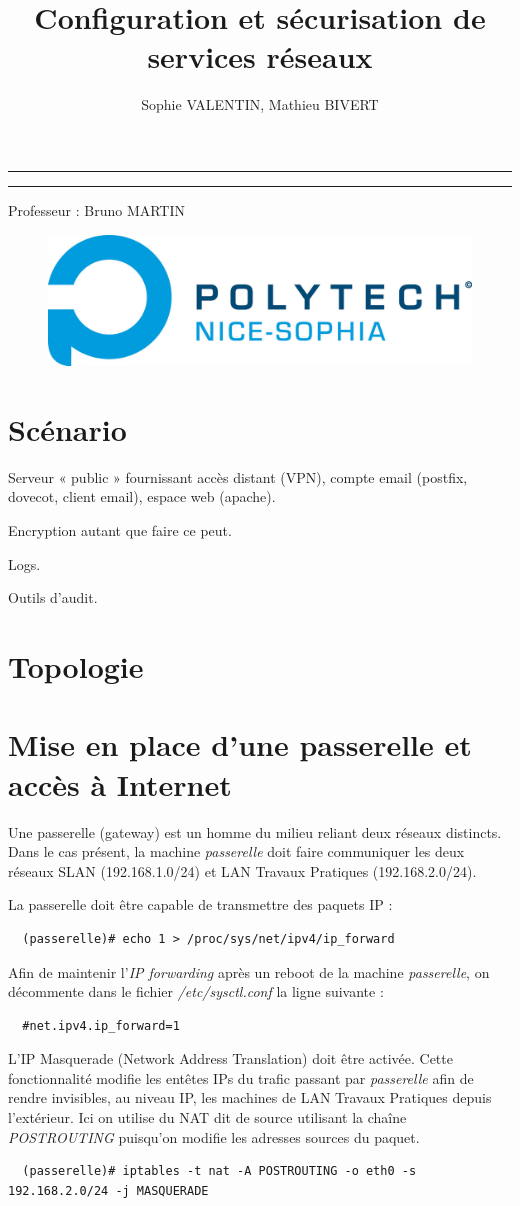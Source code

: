 \documentclass[a4paper]{article}
\title{Configuration et sécurisation de services réseaux}
\author{Sophie VALENTIN, Mathieu BIVERT}
\makeatletter
\def\maketitle{
	\null
	\thispagestyle{empty}
	\vskip 1cm
	\begin{center}
		\normalfont\large\huge\@author
	\end{center}
	\vfil
	\vfil
	\vfil
	\vfil
	\vfil
	\vfil
	\vfil
	\vfil
	\vfil
	\vfil
	\vfil
	\hrule height 2pt
	\par
	\begin{center}
				\huge \strut \@title \par
				\@date
	\end{center}
	\hrule height 2pt
	\par
	\vfil
	\vfil
	\vfil
	\vfil
	\vfil
	\vfil
	\vfil
	\vfil
	\vfil
	\vfil
	\vfil
	\vfil
	\vfil
	\vfil
	\vfil
	\vfil
	\vfil
	\vfil
	\vfil
	\vfil
	\vfil
	\vfil
	\vfil
	\vfil
	\vfil
	\begin{center}
  			\huge Professeur : Bruno MARTIN
    \end{center}
	\null
	\begin{figure}[!ht]
		\centering
		\includegraphics[scale=.5]{polytech.png}
	\end{figure}
	\vfil
	\cleardoublepage
}
\makeatother
\begin{document}
\maketitle

\newpage
\tableofcontents

\newpage

\section{Scénario}
Serveur « public » fournissant accès distant (VPN), compte email
(postfix, dovecot, client email), espace web (apache).

Encryption autant que faire ce peut.

Logs.

Outils d'audit.

\section{Topologie}
\section{Mise en place d'une passerelle et accès à Internet}
Une passerelle (gateway) est un homme du milieu reliant
deux réseaux distincts. Dans le cas présent, la machine \textit{passerelle}
doit faire communiquer les deux réseaux SLAN (192.168.1.0/24) et LAN Travaux 
Pratiques (192.168.2.0/24).

La passerelle doit être capable de transmettre des paquets IP :
\begin{verbatim}
  (passerelle)# echo 1 > /proc/sys/net/ipv4/ip_forward
\end{verbatim}

Afin de maintenir l'\textit{IP forwarding} après un reboot de la machine
\textit{passerelle}, on décommente dans le fichier \textit{/etc/sysctl.conf}
la ligne suivante :
\begin{verbatim}
  #net.ipv4.ip_forward=1
\end{verbatim}

\vspace{1\baselineskip}
L'IP Masquerade (Network Address Translation) doit être
activée. Cette fonctionnalité modifie les entêtes IPs du trafic
passant par \textit{passerelle} afin de rendre invisibles, au niveau IP,
les machines de LAN Travaux Pratiques depuis l'extérieur.
Ici on utilise du NAT dit de source utilisant la chaîne 
\textit{POSTROUTING} puisqu'on modifie les adresses sources du paquet.
\begin{verbatim}
  (passerelle)# iptables -t nat -A POSTROUTING -o eth0 -s 192.168.2.0/24 -j MASQUERADE
\end{verbatim}
\end{document}
